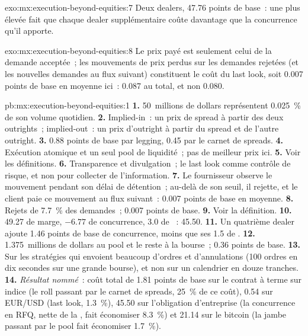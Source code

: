 \begin{solution}{exo:mx:execution-beyond-equities:7}
Deux dealers, 47.76 points de base~: une  plus élevée fait que chaque dealer supplémentaire coûte davantage que la concurrence qu'il apporte.
\end{solution}

\begin{solution}{exo:mx:execution-beyond-equities:8}
Le prix payé est seulement celui de la demande acceptée~; les mouvements de prix perdus sur les demandes rejetées (et les nouvelles demandes au flux suivant) constituent le coût du last
look, soit 0.007 points de base en moyenne ici~: 0.087 au total, et non 0.080.
\end{solution}

\begin{solution}{pb:mx:execution-beyond-equities:1}
\textbf{1.} 50~millions de dollars représentent 0.025~\% de son volume quotidien.
\textbf{2.} Implied-in~: un prix de spread à partir des deux outrights~; implied-out~: un prix d'outright à partir du spread et de l'autre outright.
\textbf{3.} 0.88 points de base par legging, 0.45 par le carnet de spreads.
\textbf{4.} Exécution atomique et un seul pool de liquidité~; pas de meilleur prix ici.
\textbf{5.} Voir les définitions.
\textbf{6.} Transparence et divulgation~; le last look comme contrôle de risque, et non pour collecter de l'information.
\textbf{7.} Le fournisseur observe le mouvement pendant son délai de détention~; au-delà de son seuil, il rejette, et le client paie ce mouvement au flux suivant~: 0.007
points de base en moyenne.
\textbf{8.} Rejets de 7.7~\% des demandes~; 0.007 points de base.
\textbf{9.} Voir la définition.
\textbf{10.} 49.27 de marge, $-6.77$ de concurrence, 3.0 de ~: 45.50.
\textbf{11.} Un quatrième dealer ajoute 1.46 points de base de concurrence, moins que ses 1.5 de .
\textbf{12.} 1.375~millions de dollars au pool et le reste à la bourse~; 0.36 points de base.
\textbf{13.} Sur les stratégies qui envoient beaucoup d'ordres et d'annulations (100 ordres en dix secondes sur une grande bourse), et non sur un calendrier en douze tranches.
\textbf{14.} \emph{Résultat nommé}~: coût total de 1.81 points de base sur le contrat à terme sur indice (le roll passant par le carnet de spreads, 25~\% de ce coût), 0.54 sur EUR/USD (last look,
1.3~\%), 45.50 sur l'obligation d'entreprise (la concurrence en RFQ, nette de la , fait économiser 8.3~\%) et 21.14 sur le bitcoin (la jambe passant par le pool fait économiser 1.7~\%).

\end{solution}
